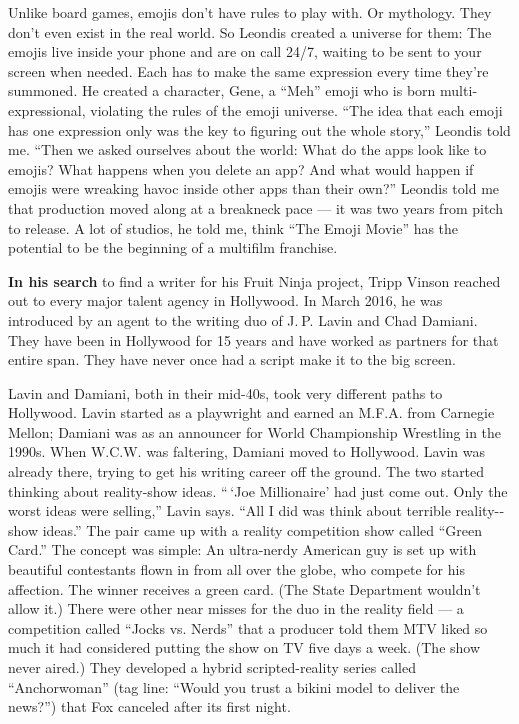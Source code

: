 Unlike board games, emojis don't have rules to play with. Or mythology.
They don't even exist in the real world. So Leondis created a universe
for them: The emojis live inside your phone and are on call 24/7,
waiting to be sent to your screen when needed. Each has to make the same
expression every time they're summoned. He created a character, Gene, a
``Meh'' emoji who is born multi­expressional, violating the rules of the
emoji universe. ``The idea that each emoji has one expression only was
the key to figuring out the whole story,'' Leondis told me. ``Then we
asked ourselves about the world: What do the apps look like to emojis?
What happens when you delete an app? And what would happen if emojis
were wreaking havoc inside other apps than their own?'' Leondis told me
that production moved along at a breakneck pace --- it was two years
from pitch to release. A lot of studios, he told me, think ``The Emoji
Movie'' has the potential to be the beginning of a multifilm franchise.

\textbf{In his search} to find a writer for his Fruit Ninja project,
Tripp Vinson reached out to every major talent agency in Hollywood. In
March 2016, he was introduced by an agent to the writing duo of J. P.
Lavin and Chad Damiani. They have been in Hollywood for 15 years and
have worked as partners for that entire span. They have never once had a
script make it to the big screen.

Lavin and Damiani, both in their mid-40s, took very different paths to
Hollywood. Lavin started as a playwright and earned an M.F.A. from
Carnegie Mellon; Damiani was as an announcer for World Championship
Wrestling in the 1990s. When W.C.W. was faltering, Damiani moved to
Hollywood. Lavin was already there, trying to get his writing career off
the ground. The two started thinking about reality-­show ideas. `` `Joe
Millionaire' had just come out. Only the worst ideas were selling,''
Lavin says. ``All I did was think about terrible reality-­show ideas.''
The pair came up with a reality competition show called ``Green Card.''
The concept was simple: An ultra-­nerdy American guy is set up with
beautiful contestants flown in from all over the globe, who compete for
his affection. The winner receives a green card. (The State Department
wouldn't allow it.) There were other near misses for the duo in the
reality field --- a competition called ``Jocks vs. Nerds'' that a
producer told them MTV liked so much it had considered putting the show
on TV five days a week. (The show never aired.) They developed a hybrid
scripted-­reality series called ``Anchorwoman'' (tag line: ``Would you
trust a bikini model to deliver the news?'') that Fox canceled after its
first night.


